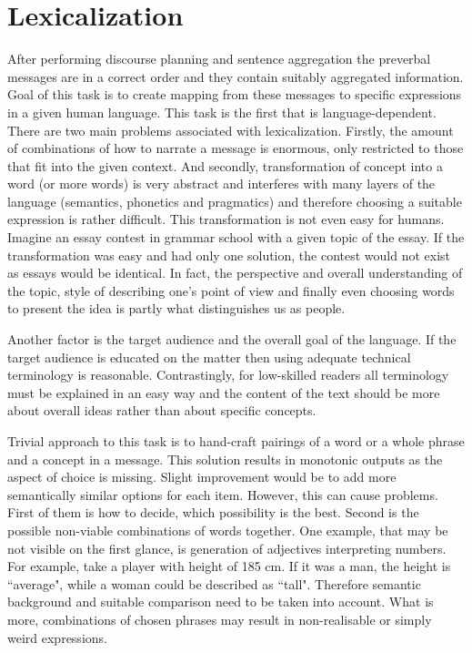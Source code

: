 \section{Lexicalization}
After performing discourse planning and sentence aggregation the preverbal messages are in a correct order and they contain suitably aggregated information. Goal of this task is to create mapping from these messages to specific expressions in a given human language. This task is the first that is language-dependent. There are two main problems associated with lexicalization. Firstly, the amount of combinations of how to narrate a message is enormous, only restricted to those that fit into the given context. And secondly, transformation of concept into a word (or more words) is very abstract and interferes with many layers of the language (semantics, phonetics and pragmatics) and therefore choosing a suitable expression is rather difficult. This transformation is not even easy for humans. Imagine an essay contest in grammar school with a given topic of the essay. If the transformation was easy and had only one solution, the contest would not exist as essays would be identical. In fact, the perspective and overall understanding of the topic, style of describing one’s point of view and finally even choosing words to present the idea is partly what distinguishes us as people. 

Another factor is the target audience and the overall goal of the language. If the target audience is educated on the matter then using adequate technical terminology is reasonable. Contrastingly, for low-skilled readers all terminology must be explained in an easy way and the content of the text should be more about overall ideas rather than about specific concepts. 

Trivial approach to this task is to hand-craft pairings of a word or a whole phrase and a concept in a message. This solution results in monotonic outputs as the aspect of choice is missing. Slight improvement would be to add more semantically similar options for each item. However, this can cause problems. First of them is how to decide, which possibility is the best. Second is the possible non-viable combinations of words together. One example, that may be not visible on the first glance, is generation of adjectives interpreting numbers. For example, take a player with height of 185 cm. If it was a man, the height is ``average", while a woman could be described as ``tall". Therefore semantic background and suitable comparison need to be taken into account. What is more, combinations of chosen phrases may result in non-realisable or simply weird expressions. 

